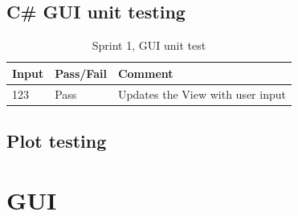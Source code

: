 \documentclass[a4paper, oneside, 11pt]{report}
\begin{document}
\newpage
\section{C\# GUI unit testing}

\begin{table}[h]
\caption{Sprint 1, GUI unit test}
\label{sprint1-gui-test}
\begin{tabular}{|l|l|l|}
\hline
\textbf{Input} & \textbf{Pass/Fail} & \textbf{Comment}                 \\ \hline
123            & Pass               & Updates the View with user input \\ \hline
\end{tabular}
\end{table}


\section{Plot testing}

\chapter{GUI}
\label{app:gui}
\end{document}
